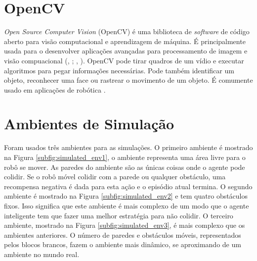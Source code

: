 \section{OpenCV}

\textit{Open Source Computer Vision} (OpenCV) é uma biblioteca de \textit{software} de código aberto para visão computacional e aprendizagem de máquina.
É principalmente usada para o desenvolver aplicações avançadas para processamento de imagem e visão compuacional (\citeauthor{bradski2008learning}, \citeyear{bradski2008learning}; \citeauthor{wang2010camera}, \citeyear{wang2010camera}).
OpenCV pode tirar quadros de um vídio e executar algoritmos para pegar informações necessárias.
Pode também identificar um objeto, reconhecer uma face ou rastrear o movimento de um objeto.
É comumente usado em aplicações de robótica \cite{oyama2009come}.

\section{Ambientes de Simulação}

Foram usados três ambientes para as simulações.
O primeiro ambiente é mostrado na Figura \ref{subfig:simulated_env1}, o ambiente representa uma área livre para o robô se mover.
As paredes do ambiente são as únicas coisas onde o agente pode colidir.
Se o robô móvel colidir com a parede ou qualquer obstáculo, uma recompensa negativa é dada para esta ação e o episódio atual termina.
O segundo ambiente é mostrado na Figura \ref{subfig:simulated_env2} e tem quatro obstáculos fixos.
Isso significa que este ambiente é mais complexo de um modo que o agente inteligente tem que fazer uma melhor estratégia para não colidir.
O terceiro ambiente, mostrado na Figura \ref{subfig:simulated_env3}, é mais complexo que os ambientes anteriores.
O número de paredes e obstáculos móveis, representados pelos blocos brancos, fazem o ambiente mais dinâmico, se aproximando de um ambiente no mundo real.

